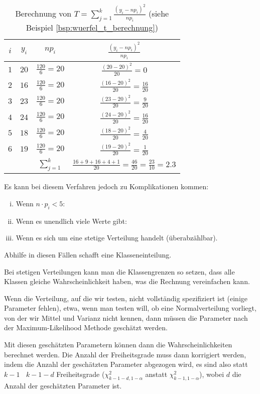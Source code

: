 \begin{table}
    \centering
    \begin{tabular}{|c|c|c|c|}
        \hline
        $i$ & $y_i$ & $np_i$ & $\frac{(y_i-np_i)^2}{np_i}$\\
        \hline
        $1$ & $20$ & $\frac{120}{6}=20$ & $\frac{(20-20)^2}{20}=0$ \\
        \hline
        $2$ & $16$ & $\frac{120}{6}=20$ & $\frac{(16-20)^2}{20}=\frac{16}{20}$ \\
        \hline
        $3$ & $23$ & $\frac{120}{6}=20$ & $\frac{(23-20)^2}{20}=\frac{9}{20}$ \\
        \hline
        $4$ & $24$ & $\frac{120}{6}=20$ & $\frac{(24-20)^2}{20}=\frac{16}{20}$ \\
        \hline
        $5$ & $18$ & $\frac{120}{6}=20$ & $\frac{(18-20)^2}{20}=\frac{4}{20}$ \\
        \hline
        $6$ & $19$ & $\frac{120}{6}=20$ & $\frac{(19-20)^2}{20}=\frac{1}{20}$ \\
        \hline
        & & $\sum_{j=1}^k$ & $\frac{16+9+16+4+1}{20}=\frac{46}{20}=\frac{23}{10}=2.3$\\
        \hline
    \end{tabular}
    \caption{Berechnung von $T=\sum_{j=1}^k\frac{(y_i-np_i)^2}{np_i}$ (siehe Beispiel \ref{bsp:wuerfel_t_berechnung})}\label{tab:wuerfel_t_berechnung}
\end{table}

Es kann bei diesem Verfahren jedoch zu Komplikationen kommen:
\begin{enumerate}[i)]
    \item Wenn $n\cdot p_i<5$:
    \item Wenn es unendlich viele Werte gibt:
    \item Wenn es sich um eine stetige Verteilung handelt (überabzählbar).
\end{enumerate}
Abhilfe in diesen Fällen schafft eine Klasseneinteilung.

Bei stetigen Verteilungen kann man die Klassengrenzen so setzen, dass alle
Klassen gleiche Wahrscheinlichkeit haben, was die Rechnung vereinfachen
kann.

\begin{satz}\label{satz:verteilung_nicht_vollstaendig}
Wenn die Verteilung, auf die wir testen, nicht vollständig spezifiziert ist (einige Parameter fehlen),
etwa, wenn man testen will, ob eine Normalverteilung vorliegt, von der wir
Mittel und Varianz nicht kennen, dann müssen die Parameter nach der
Maximum-Likelihood Methode geschätzt werden.
\end{satz}
Mit diesen geschätzten Parametern können dann die Wahrscheinlichkeiten berechnet werden. Die Anzahl der
Freiheitsgrade muss dann korrigiert werden, indem die Anzahl der
geschätzten Parameter abgezogen wird, es sind also statt ${k-1}\;\;$ ${k-1-d}$ Freiheitsgrade ($\chi^2_{k-1-d,1-\alpha}$ anstatt $\chi^2_{k-1,1-\alpha}$), wobei $d$ die Anzahl der geschätzten Parameter ist.

